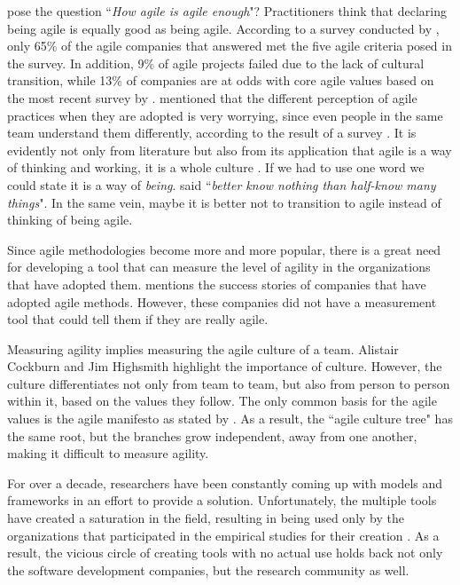 \citet{comparative_agility} pose the question ``\textit{How agile is agile enough}"? Practitioners think that declaring being agile is equally good as being agile. According to a survey conducted by \citet{ambysoft}, only 65\% of the agile companies that answered met the five agile criteria posed in the survey. In addition, 9\% of agile projects failed due to the lack of cultural transition, while 13\% of companies are at odds with core agile values based on the most recent survey by \citet{versionOne}. \citet{poonacha} mentioned that the different perception of agile practices when they are adopted is very worrying, since even people in the same team understand them differently, according to the result of a survey \cite{ambler}. It is evidently not only from literature but also from its application that agile is a way of thinking and working, it is a whole culture \cite{poonacha}. If we had to use one word we could state it is a way of \textit{being}. \citet{Nietzsche} said ``\textit{better know nothing than half-know many things}". In the same vein, maybe it is better not to transition to agile instead of thinking of being agile. 

Since agile methodologies become more and more popular, there is a great need for developing a tool that can measure the level of agility in the organizations that have adopted them. \citet{sidky} mentions the success stories of companies that have adopted agile methods. However, these companies did not have a measurement tool that could tell them if they are really agile.

Measuring agility implies measuring the agile culture of a team. Alistair Cockburn \cite{cockburn2002agile, Cockburn-poetry} and Jim Highsmith \cite{Highsmith:2002} highlight the importance of culture. However, the culture  differentiates not only from team to team, but also from person to person within it, based on the values they follow. The only common basis for the agile values is the agile manifesto\cite{beck2001agile} as stated by \citet{Ingalls}. As a result, the ``agile culture tree" has the same root, but the branches grow independent, away from one another, making it difficult to measure agility.

For over a decade, researchers have been constantly coming up with models and frameworks in an effort to provide a solution. Unfortunately, the multiple tools have created a saturation in the field, resulting in being used only by the organizations that participated in the empirical studies for their creation \cite{samireh_jalali_dissertation, jalali_angelis}. As a result, the vicious circle of creating tools with no actual use holds back not only the software development companies, but the research community as well.

